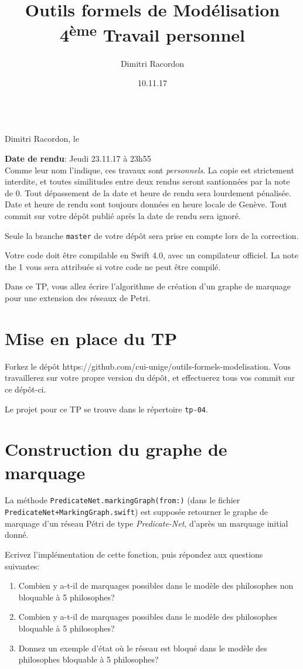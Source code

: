 \documentclass[a4paper, titlepage]{article}
\makeatletter
\numberwithin{figure}{section}
\numberwithin{table}{section}
\newcommand\deadline[1]{\def\@deadline{#1}}
\newcommand\objective[1]{\def\@objective{#1}}
\newcommand{\makecustomtitle}{%
	\begin{center}
		\huge\@title \\
		[1ex]\small Dimitri Racordon, le \@date
	\end{center}
	\begin{framed}\@deadline\end{framed}
	\begin{framed}\@objective\end{framed}
}
\makeatother
\begin{document}
\title{Outils formels de Modélisation \\ 4\textsuperscript{ème} Travail personnel}
\author{Dimitri Racordon}
\date{10.11.17}

\deadline{
\textbf{Date de rendu}: Jeudi 23.11.17 à 23h55 \\

  Comme leur nom l'indique, ces travaux sont \emph{personnels}.
  La copie est strictement interdite, et toutes similitudes entre deux rendus
  seront santionnées par la note de 0.
  Tout dépassement de la date et heure de rendu sera lourdement pénalisée.
  Date et heure de rendu sont toujours données en heure locale de Genève.
  Tout commit sur votre dépôt publié après la date de rendu sera ignoré.

  Seule la branche \texttt{master} de votre dépôt sera prise en compte
  lors de la correction.

  Votre code doit être compilable en Swift 4.0, avec un compilateur officiel.
  La note the 1 vous sera attribuée si votre code ne peut être compilé.
}

\objective{
  Dans ce TP, vous allez écrire l'algorithme de création d'un graphe de marquage
  pour une extension des réseaux de Petri.
}

\makecustomtitle

\section{Mise en place du TP}

Forkez le dépôt https://github.com/cui-unige/outils-formels-modelisation.
Vous travaillerez sur votre propre version du dépôt,
et effectuerez tous vos commit sur ce dépôt-ci.

Le projet pour ce TP se trouve dans le répertoire \texttt{tp-04}.

\section{Construction du graphe de marquage}

La méthode \texttt{PredicateNet.markingGraph(from:)}
(dans le fichier\\\texttt{PredicateNet+MarkingGraph.swift})
est supposée retourner le graphe de marquage d'un réseau Pétri de type \emph{Predicate-Net},
d'après un marquage initial donné.

Ecrivez l'implémentation de cette fonction, puis répondez aux questions suivantes:

\begin{enumerate}
  \item Combien y a-t-il de marquages possibles dans le modèle des philosophes non bloquable
        à 5 philosophes?
  \item Combien y a-t-il de marquages possibles dans le modèle des philosophes bloquable
        à 5 philosophes?
  \item Donnez un exemple d'état où le réseau est bloqué dans le modèle des philosophes bloquable
        à 5 philosophes?
\end{enumerate}
\end{document}
